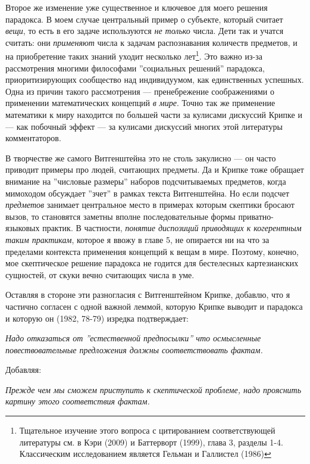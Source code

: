 \documentclass[12pt]{book}
\begin{document}
Второе же изменение уже существенное и ключевое для моего решения парадокса. В моем случае центральный пример о субъекте, который считает \textit{вещи}, то есть в его задаче используются \textit{не только} числа. Дети так и учатся считать: они \textit{применяют} числа к задачам распознавания количеств предметов, и на приобретение таких знаний уходит несколько лет\footnote{Тщательное изучение этого вопроса с цитированием соответствующей литературы см. в Кэри (2009) и Баттерворт (1999), глава 3, разделы 1-4. Классическим исследованием является Гельман и Галлистел (1986)}. Это важно из-за рассмотрения многими философами ''социальных решений'' парадокса, приоритизирующих сообщество над индивидуумом, как единственных успешных. Одна из причин такого рассмотрения --- пренебрежение соображениями о применении математических концепций \textit{в мире}. Точно так же применение математики к миру находится по большей части за кулисами дискуссий Крипке и --- как побочный эффект --- за кулисами дискуссий многих этой литературы комментаторов.

В творчестве же самого Витгенштейна это не столь закулисно --- он часто приводит примеры про людей, считающих предметы. Да и Крипке тоже обращает внимание на ''числовые размеры'' наборов подсчитываемых предметов, когда мимоходом обсуждает ''зчет'' в рамках текста Витгенштейна. Но если подсчет \textit{предметов} занимает центральное место в примерах которым скептики бросают вызов, то становятся заметны вполне последовательные формы приватно-языковых практик. В частности, \textit{понятие диспозиций приводящих к когерентным таким практикам}, которое я ввожу в главе 5, не опирается ни на что за пределами контекста применения концепций к вещам в мире. Поэтому, конечно, мое скептическое решение парадокса не годится для бестелесных картезианских сущностей, от скуки вечно считающих числа в уме.

Оставляя в стороне эти разногласия с Витгенштейном Крипке, добавлю, что я частично согласен с одной важной леммой, которую Крипке выводит и парадокса и которую он (1982, 78-79) изредка подтверждает:

\smallskip

\textit{Надо отказаться от ''естественной предпосылки'' что осмысленные повествовательные предложения должны соответствовать фактам.}

\smallskip

Добавляя:

\smallskip

\textit{Прежде чем мы сможем приступить к скептической проблеме, надо прояснить картину этого соответствия фактам.}
\end{document}
